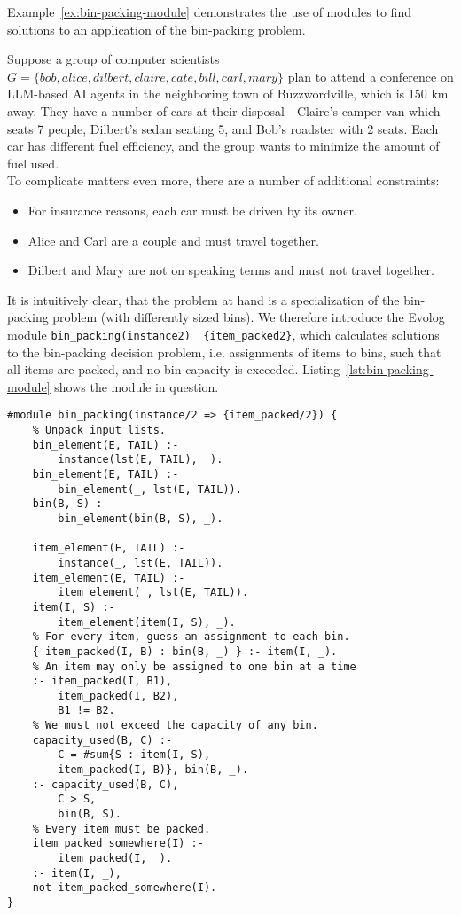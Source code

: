 Example~\ref{ex:bin-packing-module} demonstrates the use of modules to find solutions to an application of the bin-packing problem.

\begin{example}
\label{ex:bin-packing-module}
Suppose a group of computer scientists $G = \{\mathit{bob}, \mathit{alice}, \mathit{dilbert}, \mathit{claire}, \mathit{cate}, \mathit{bill}, \mathit{carl}, \mathit{mary}\}$ plan to attend a conference on LLM-based AI agents in the neighboring town of Buzzwordville, which is 150 km away. They have a number of cars at their disposal - Claire's camper van which seats 7 people, Dilbert's sedan seating 5, and Bob's roadster with 2 seats. Each car has different fuel efficiency, and the group wants to minimize the amount of fuel used.\\
To complicate matters even more, there are a number of additional constraints:
\begin{itemize}
	\item For insurance reasons, each car must be driven by its owner.
	\item Alice and Carl are a couple and must travel together.
	\item Dilbert and Mary are not on speaking terms and must not travel together.
\end{itemize}
It is intuitively clear, that the problem at hand is a specialization of the bin-packing problem (with differently sized bins). We therefore introduce the Evolog module \texttt{bin\_packing(instance\/2) \=\> \{item\_packed\/2\}}, which calculates solutions to the bin-packing decision problem, i.e. assignments of items to bins, such that all items are packed, and no bin capacity is exceeded. Listing~\ref{lst:bin-packing-module} shows the module in question.
\begin{lstlisting}[style=asp-code, label={lst:bin-packing-module}, caption={Bin-packing module}]
#module bin_packing(instance/2 => {item_packed/2}) {
	% Unpack input lists.
	bin_element(E, TAIL) :- 
		instance(lst(E, TAIL), _).
	bin_element(E, TAIL) :- 
		bin_element(_, lst(E, TAIL)).
	bin(B, S) :- 
		bin_element(bin(B, S), _).
	
	item_element(E, TAIL) :- 
		instance(_, lst(E, TAIL)).
	item_element(E, TAIL) :- 
		item_element(_, lst(E, TAIL)).
	item(I, S) :- 
		item_element(item(I, S), _).
	% For every item, guess an assignment to each bin.
	{ item_packed(I, B) : bin(B, _) } :- item(I, _).
	% An item may only be assigned to one bin at a time
	:- item_packed(I, B1), 
		item_packed(I, B2), 
		B1 != B2.
	% We must not exceed the capacity of any bin.
	capacity_used(B, C) :- 
		C = #sum{S : item(I, S), 
		item_packed(I, B)}, bin(B, _).
	:- capacity_used(B, C), 
		C > S, 
		bin(B, S).
	% Every item must be packed.
	item_packed_somewhere(I) :- 
		item_packed(I, _).
	:- item(I, _), 
	not item_packed_somewhere(I).
}	
\end{lstlisting}


\end{example}
